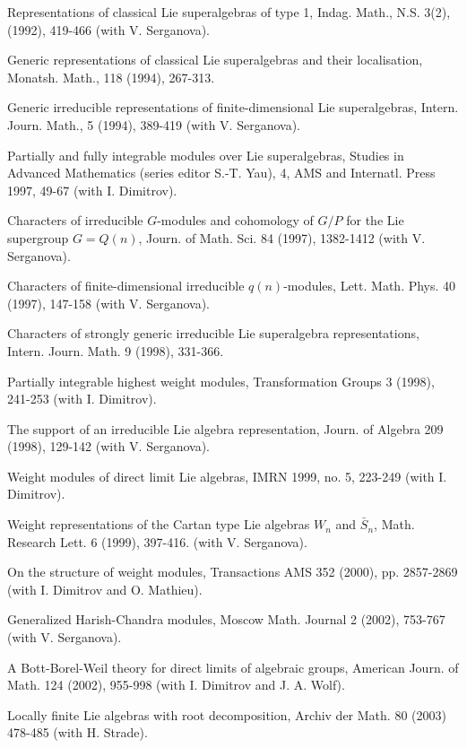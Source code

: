 \documentclass[11pt]{amsart}
\begin{document}
\myss \label{18.}  Representations of classical Lie superalgebras
of type 1, Indag. Math., N.S. 3(2), (1992), 419-466 (with V.
Serganova).

\myss \label{19.}  Generic representations of classical Lie
superalgebras and their localisation, Monatsh. Math., 118 (1994),
267-313.

\myss \label{20.}  Generic irreducible representations of
finite-dimensional Lie superalgebras, Intern. Journ. Math., 5
(1994), 389-419 (with V. Serganova).

\myss \label{21.}  Partially and fully integrable modules over Lie
superalgebras, Studies in Advanced Mathematics (series editor
S.-T. Yau), 4, AMS and Internatl. Press 1997, 49-67 (with I.
Dimitrov).

\myss \label{22.}  Characters of irreducible $G$-modules and
cohomology of $G/P$ for the Lie supergroup $G=Q(n)$, Journ. of
Math. Sci. 84 (1997), 1382-1412 (with V. Serganova).

\myss \label{23.}  Characters of finite-dimensional irreducible
$q(n)$-modules, Lett. Math. Phys.  40 (1997), 147-158 (with V.
Serganova).

\myss \label{24.}  Characters of strongly generic irreducible Lie
superalgebra representations, Intern. Journ. Math. 9 (1998),
331-366.

\myss \label{25.}  Partially integrable highest weight modules,
Transformation Groups 3 (1998), 241-253 (with I. Dimitrov).

\myss \label{26.}  The support of an irreducible Lie algebra
representation, Journ. of Algebra 209 (1998), 129-142 (with V.
Serganova).

\myss \label{27.} Weight modules of direct limit Lie algebras,
IMRN 1999, no. 5, 223-249  (with I. Dimitrov).

\myss \label{28.} Weight representations of the Cartan type Lie
algebras $W_n$ and $\bar{S}_n$, Math. Research Lett. 6 (1999),
397-416. (with V. Serganova).

\myss \label{29.}  On the structure of weight modules,
Transactions AMS 352 (2000), pp. 2857-2869 (with I. Dimitrov and O.
Mathieu).

\myss \label{30.} Generalized Harish-Chandra modules, Moscow Math.
Journal 2 (2002), 753-767 (with V. Serganova).

\myss \label{31.} A Bott-Borel-Weil theory for direct limits of
algebraic groups, American Journ. of Math.  124 (2002), 955-998
(with I. Dimitrov and J. A. Wolf).

\myss \label{32.} Locally finite Lie algebras with root
decomposition, Archiv der Math. 80 (2003) 478-485 (with H.
Strade).
\end{document}
